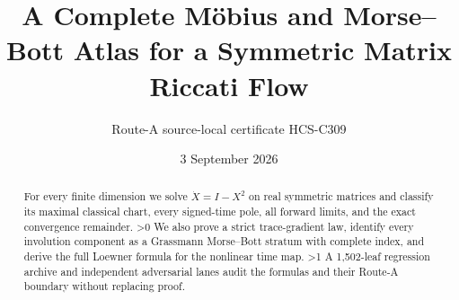 \documentclass[10pt]{article}
\title{A Complete M\"obius and Morse--Bott Atlas for a Symmetric Matrix Riccati Flow}
\author{Route-A source-local certificate HCS-C309}
\date{3 September 2026}
\providecommand{\CRevisionRound}{2}
\begin{document}
\maketitle
\begin{abstract}
For every finite dimension we solve $\dot X=I-X^2$ on real symmetric
matrices and classify its maximal classical chart, every signed-time pole,
all forward limits, and the exact convergence remainder.
\ifnum\CRevisionRound>0
We also prove a strict trace-gradient law, identify every involution
component as a Grassmann Morse--Bott stratum with complete index, and derive
the full Loewner formula for the nonlinear time map.
\fi
\ifnum\CRevisionRound>1
A 1,502-leaf regression archive and independent adversarial lanes audit the
formulas and their Route-A boundary without replacing proof.
\fi
\end{abstract}
\end{document}
